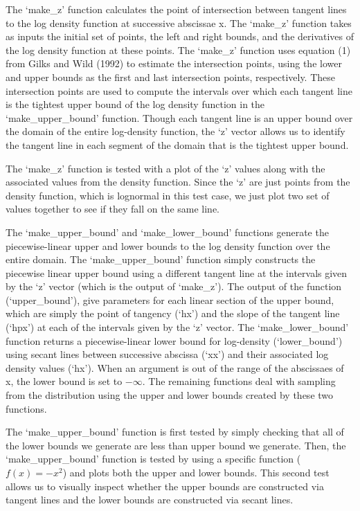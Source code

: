 \documentclass{article}
\begin{document}
The `make\_z' function calculates the point of intersection between tangent lines to the log density function at successive abscissae x.  The `make\_z' function takes as inputs the initial set of points, the left and right bounds, and the derivatives of the log density function at these points. The `make\_z' function uses equation (1) from Gilks and Wild (1992) to estimate the intersection points, using the lower and upper bounds as the first and last intersection points, respectively. These intersection points are used to compute the intervals over which each tangent line is the tightest upper bound of the log density function in the `make\_upper\_bound' function. Though each tangent line is an upper bound over the domain of the entire log-density function, the `z' vector allows us to identify the tangent line in each segment of the domain that is the tightest upper bound.

The `make\_z' function is tested with a plot of the `z' values along with the associated values from the density function. Since the `z' are just points from the density function, which is lognormal in this test case, we just plot two set of values together to see if they fall on the same line.

The `make\_upper\_bound' and `make\_lower\_bound' functions generate the piecewise-linear upper and lower bounds to the log density function over the entire domain. The `make\_upper\_bound' function simply constructs the piecewise linear upper bound using a different tangent line at the intervals given by the `z' vector (which is the output of `make\_z'). The output of the function (`upper\_bound'), give parameters for each linear section of the upper bound, which are simply the point of tangency (`hx') and the slope of the tangent line (`hpx') at each of the intervals given by the `z' vector. The `make\_lower\_bound' function returns a piecewise-linear lower bound for log-density (`lower\_bound') using secant lines between successive abscissa (`xx') and their associated log density values (`hx'). When an argument is out of the range of the abscissaes of x, the lower bound is set to $-\infty$. The remaining functions deal with sampling from the distribution using the upper and lower bounds created by these two functions.

The `make\_upper\_bound' function is first tested by simply checking that all of the lower bounds we generate are less than upper bound we generate.  Then, the `make\_upper\_bound' function is tested by using a specific function ($f(x)=-x^2$) and plots both the upper and lower bounds. This second test allows us to visually inspect whether the upper bounds are constructed via tangent lines and the lower bounds are constructed via secant lines.
\end{document}
